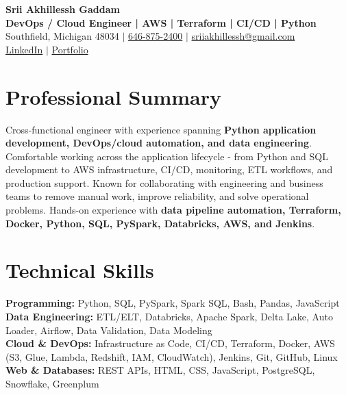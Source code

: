 \documentclass[letterpaper,10pt]{article}
\begin{document}
\fontsize{9.35pt}{10.45pt}\selectfont

\begin{center}
    {\LARGE \textbf{Srii Akhillessh Gaddam}} \\[-1pt]
    \textbf{DevOps / Cloud Engineer | AWS | Terraform | CI/CD | Python} \\[2pt]
    Southfield, Michigan 48034 $|$
    \href{tel:6468752400}{646-875-2400} $|$
    \href{mailto:sriiakhillessh@gmail.com}{sriiakhillessh@gmail.com} \\[1pt]
    \href{https://www.linkedin.com/in/srii-akhiilessh-gaddam-b48668191/}{LinkedIn} $|$
    \href{https://sriiakhillesshg.github.io/portfolio/}{Portfolio}
\end{center}
\vspace{-8pt}

\section{Professional Summary}
\small{Cross-functional engineer with experience spanning \textbf{Python application development, DevOps/cloud automation, and data engineering}. Comfortable working across the application lifecycle - from Python and SQL development to AWS infrastructure, CI/CD, monitoring, ETL workflows, and production support. Known for collaborating with engineering and business teams to remove manual work, improve reliability, and solve operational problems. Hands-on experience with \textbf{data pipeline automation, Terraform, Docker, Python, SQL, PySpark, Databricks, AWS, and Jenkins}.}

\section{Technical Skills}
\small{
\textbf{Programming:} Python, SQL, PySpark, Spark SQL, Bash, Pandas, JavaScript \\
\textbf{Data Engineering:} ETL/ELT, Databricks, Apache Spark, Delta Lake, Auto Loader, Airflow, Data Validation, Data Modeling \\
\textbf{Cloud \& DevOps:} Infrastructure as Code, CI/CD, Terraform, Docker, AWS (S3, Glue, Lambda, Redshift, IAM, CloudWatch), Jenkins, Git, GitHub, Linux \\
\textbf{Web \& Databases:} REST APIs, HTML, CSS, JavaScript, PostgreSQL, Snowflake, Greenplum
}
\end{document}
